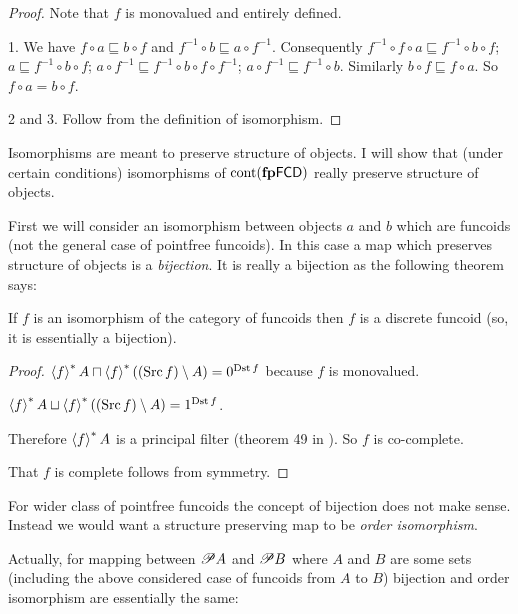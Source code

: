 \begin{proof}
  Note that $f$ is monovalued and entirely defined.
  
  1. We have $f \circ a \sqsubseteq b \circ f$ and $f^{- 1} \circ b
  \sqsubseteq a \circ f^{- 1}$. Consequently $f^{- 1} \circ f \circ a
  \sqsubseteq f^{- 1} \circ b \circ f$; $a \sqsubseteq f^{- 1} \circ b \circ
  f$; $a \circ f^{- 1} \sqsubseteq f^{- 1} \circ b \circ f \circ f^{- 1}$; $a
  \circ f^{- 1} \sqsubseteq f^{- 1} \circ b$. Similarly $b \circ f \sqsubseteq
  f \circ a$. So $f \circ a = b \circ f$.
  
  2 and 3. Follow from the definition of isomorphism.
\end{proof}

Isomorphisms are meant to preserve structure of objects. I will show that
(under certain conditions) isomorphisms of $\operatorname{cont}
(\mathbf{fp} \mathsf{FCD})$ really preserve
structure of objects.

First we will consider an isomorphism between objects $a$ and $b$ which are
funcoids (not the general case of pointfree funcoids). In this case a map
which preserves structure of objects is a \emph{bijection}. It is really a
bijection as the following theorem says:

\begin{thm}
If $f$ is an isomorphism of the category of funcoids then $f$ is a discrete
funcoid (so, it is essentially a bijection).
\end{thm}

\begin{proof}
  $\left\langle f\right\rangle^{\ast} A \sqcap \left\langle f\right\rangle^{\ast} ((\operatorname{Src} f)
  \setminus A) = 0^{\operatorname{Dst} f}$ because $f$ is monovalued.
  
  $\left\langle f\right\rangle^{\ast} A \sqcup \left\langle f\right\rangle^{\ast} ((\operatorname{Src} f)
  \setminus A) = 1^{\operatorname{Dst} f}$.
  
  Therefore $\left\langle f\right\rangle^{\ast} A$ is a principal filter (theorem 49 in
  {\cite{filters}}). So $f$ is co-complete.
  
  That $f$ is complete follows from symmetry.
\end{proof}

For wider class of pointfree funcoids the concept of bijection does not make
sense. Instead we would want a structure preserving map to be \emph{order
isomorphism}.

Actually, for mapping between $\mathscr{P} A$ and $\mathscr{P} B$ where $A$
and $B$ are some sets (including the above considered case of funcoids from
$A$ to $B$) bijection and order isomorphism are essentially the same:

